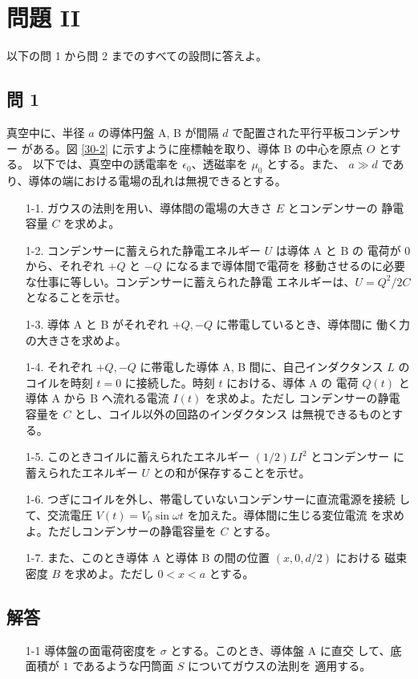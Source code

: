 \documentclass[report]{dennou777}
\begin{document}
\section{問題 II}
以下の問 1 から問 2 までのすべての設問に答えよ。

\subsection*{問 1}
真空中に、半径 $a$ の導体円盤 A, B が間隔 $d$ で配置された平行平板コンデンサー
がある。図 \ref{30-2} に示すように座標軸を取り、導体 B の中心を原点 $O$ とする。
以下では、真空中の誘電率を $\epsilon_0$、透磁率を $\mu_0$ とする。また、
$a\gg d$ であり、導体の端における電場の乱れは無視できるとする。

\begin{itemize}
	\item[1-1.] ガウスの法則を用い、導体間の電場の大きさ $E$ とコンデンサーの
		静電容量 $C$ を求めよ。
	\item[1-2.] コンデンサーに蓄えられた静電エネルギー $U$ は導体 A と B の
		電荷が $0$ から、それぞれ $+Q$ と $-Q$ になるまで導体間で電荷を
		移動させるのに必要な仕事に等しい。コンデンサーに蓄えられた静電
		エネルギーは、$U=Q^2/2C$ となることを示せ。
	\item[1-3.] 導体 A と B がそれぞれ $+Q, -Q$ に帯電しているとき、導体間に
		働く力の大きさを求めよ。
	\item[1-4.] それぞれ $+Q, -Q$ に帯電した導体 A, B 間に、自己インダクタンス
		$L$ のコイルを時刻 $t=0$ に接続した。時刻 $t$ における、導体 A の
		電荷 $Q(t)$ と導体 A から B へ流れる電流 $I(t)$ を求めよ。ただし
		コンデンサーの静電容量を $C$ とし、コイル以外の回路のインダクタンス
		は無視できるものとする。
	\item[1-5.] このときコイルに蓄えられたエネルギー $(1/2)LI^2$ とコンデンサー
		に蓄えられたエネルギー $U$ との和が保存することを示せ。
	\item[1-6.] つぎにコイルを外し、帯電していないコンデンサーに直流電源を接続
		して、交流電圧 $V(t)=V_0\sin\omega t$ を加えた。導体間に生じる変位電流
		を求めよ。ただしコンデンサーの静電容量を $C$ とする。
	\item[1-7.] また、このとき導体 A と導体 B の間の位置 $(x,0,d/2)$ における
		磁束密度 $B$ を求めよ。ただし $0<x<a$ とする。
\end{itemize}

\subsection*{解答}
\begin{itemize}
	\item[1-1]
		導体盤の面電荷密度を $\sigma$ とする。このとき、導体盤 A に直交
		して、底面積が $1$ であるような円筒面 $S$ についてガウスの法則を
		適用する。
\end{itemize}
\end{document}
